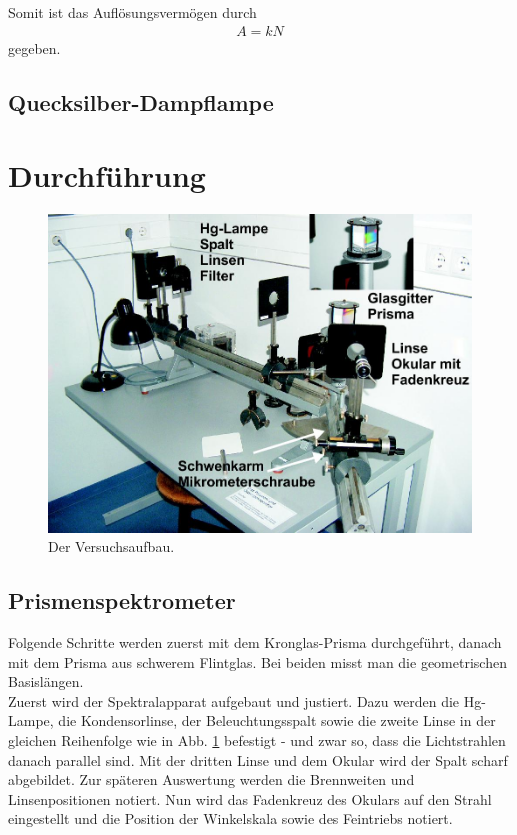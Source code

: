 \documentclass[12pt,a4paper,titlepage,headinclude,bibtotoc]{scrartcl}
\begin{document}
Somit ist das Auflösungsvermögen durch
\begin{align}
	A=kN
\end{align}
gegeben.

\subsection{Quecksilber-Dampflampe}

\section{Durchführung}
\label{sec:durchfuehrung}

\begin{figure}[!h]
	\centering
	\includegraphics[scale=0.4]{Aufbau.jpg}
	\caption{Der Versuchsaufbau. \cite[Datum: 28.12.2014]{LP19}}
	\label{fig:aufbau}
\end{figure}

\subsection{Prismenspektrometer}
Folgende Schritte werden zuerst mit dem Kronglas-Prisma durchgeführt, danach mit dem Prisma aus schwerem Flintglas.
Bei beiden misst man die geometrischen Basislängen.\\

Zuerst wird der Spektralapparat aufgebaut und justiert.
Dazu werden die Hg-Lampe, die Kondensorlinse, der Beleuchtungsspalt sowie die zweite Linse in der gleichen Reihenfolge wie in Abb. \ref{fig:aufbau} befestigt - und zwar so, dass die Lichtstrahlen danach parallel sind.
Mit der dritten Linse und dem Okular wird der Spalt scharf abgebildet.
Zur späteren Auswertung werden die Brennweiten und Linsenpositionen notiert.
Nun wird das Fadenkreuz des Okulars auf den Strahl eingestellt und die Position der Winkelskala sowie des Feintriebs notiert.
\end{document}

